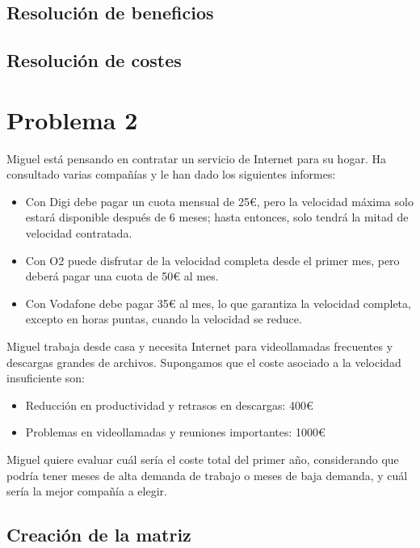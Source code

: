 \documentclass[
  letterpaper,
  DIV=11,
  numbers=noendperiod]{scrartcl}
\begin{document}
\subsection{Resolución de beneficios}\label{resoluciuxf3n-de-beneficios}

\subsection{Resolución de costes}\label{resoluciuxf3n-de-costes}

\pagebreak

\section{Problema 2}\label{problema-2}

Miguel está pensando en contratar un servicio de Internet para su hogar.
Ha consultado varias compañías y le han dado los siguientes informes:

\begin{itemize}
\item
  Con Digi debe pagar un cuota mensual de 25€, pero la velocidad máxima
  solo estará disponible después de 6 meses; hasta entonces, solo tendrá
  la mitad de velocidad contratada.
\item
  Con O2 puede disfrutar de la velocidad completa desde el primer mes,
  pero deberá pagar una cuota de 50€ al mes.
\item
  Con Vodafone debe pagar 35€ al mes, lo que garantiza la velocidad
  completa, excepto en horas puntas, cuando la velocidad se reduce.
\end{itemize}

Miguel trabaja desde casa y necesita Internet para videollamadas
frecuentes y descargas grandes de archivos. Supongamos que el coste
asociado a la velocidad insuficiente son:

\begin{itemize}
\item
  Reducción en productividad y retrasos en descargas: 400€
\item
  Problemas en videollamadas y reuniones importantes: 1000€
\end{itemize}

Miguel quiere evaluar cuál sería el coste total del primer año,
considerando que podría tener meses de alta demanda de trabajo o meses
de baja demanda, y cuál sería la mejor compañía a elegir.

\subsection{Creación de la matriz}\label{creaciuxf3n-de-la-matriz-1}
\end{document}
